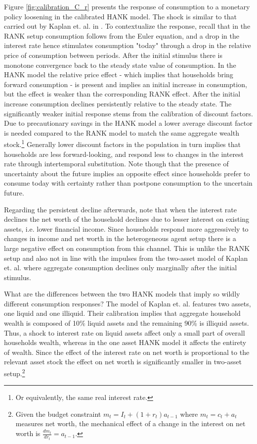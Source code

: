 Figure \ref{fig:calibration_C_r} presents the response of consumption to a monetary policy loosening in the calibrated HANK model. The shock is similar to that carried out by Kaplan et. al. in \citet{kaplan2018monetary}. To contextualize the response, recall that in the RANK setup consumption follows from the Euler equation, and a drop in the interest rate hence stimulates consumption "today" through a drop in the relative price of consumption between periods. After the initial stimulus there is monotone convergence back to the steady state value of consumption. In the HANK model the relative price effect - which implies that households bring forward consumption - is present and implies an initial increase in consumption, but the effect is weaker than the corresponding RANK effect. After the initial increase consumption declines persistently relative to the steady state. 
The significantly weaker initial response stems from the calibration of discount factors. Due to precautionary savings in the HANK model a lower average discount factor is needed compared to the RANK model to match the same aggregate wealth stock.\footnote{Or equivalently, the same real interest rate.} Generally lower discount factors in the population in turn implies that households are less forward-looking, and respond less to changes in the interest rate through intertemporal substitution. Note though that the presence of uncertainty about the future implies an opposite effect since households prefer to consume today with certainty rather than postpone consumption to the uncertain future. 

Regarding the persistent decline afterwards, note that when the interest rate declines the net worth of the household declines due to lesser interest on existing assets, i.e. lower financial income. Since households respond more aggressively to changes in income and net worth in the heterogeneous agent setup there is a large negative effect on consumption from this channel. This is unlike the RANK setup and also not in line with the impulses from the two-asset model of Kaplan et. al. where aggregate consumption declines only marginally after the initial stimulus.   

What are the differences between the two HANK models that imply so wildly different consumption responses? The model of Kaplan et. al. features two assets, one liquid and one illiquid. Their calibration implies that aggregate household wealth is composed of 10\% liquid assets and the remaining 90\% is illiquid assets. Thus, a shock to interest rate on liquid assets affect only a small part of overall households wealth, whereas in the one asset HANK model it affects the entirety of wealth. Since the effect of the interest rate on net worth is proportional to the relevant asset stock the effect on net worth is significantly smaller in two-asset setup.\footnote{Given the budget constraint $m_{t}=I_{t}+(1+r_{t})a_{t-1}$ where $m_{t}=c_{t}+a_{t}$ measures net worth, the mechanical effect of a change in the interest on net worth is $\frac{dm_{t}}{dr_{t}}=a_{t-1}$.}


